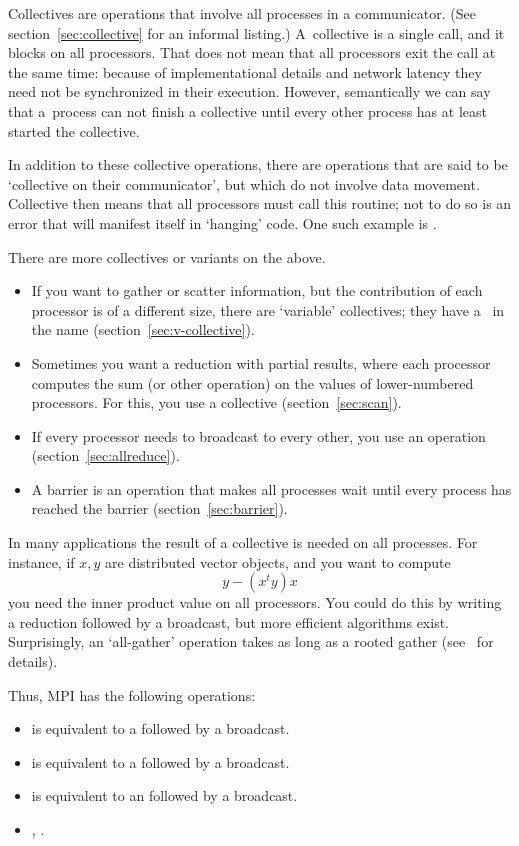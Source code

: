 Collectives are operations that involve all processes in a
communicator. (See section~\ref{sec:collective} for an informal listing.)
A~collective is a
single call, and it blocks on all processors.
That does not mean that
all processors exit the call at the same time: because of
implementational details and network
latency they need not be synchronized in their execution.
However, semantically we can say that
a~process can not finish
a collective until every other process has at least started the collective.

In addition to these collective operations, there are operations that
are said to be `collective on their communicator', but which do not
involve data movement. Collective then means that all processors must
call this routine; not to do so is an error that will 
manifest itself in `hanging' code. One such example is
.

There are more collectives or variants on the above.
\begin{itemize}
\item If you want to gather or scatter information, but the contribution
  of each processor is of a different size, there are `variable' collectives;
  they have a~ in the name (section~\ref{sec:v-collective}).
\item Sometimes you want a reduction with partial results, where each processor
  computes the sum (or other operation) on the values of lower-numbered processors.
  For this, you use a  collective (section~\ref{sec:scan}).
\item If every processor needs to broadcast to every other, you use an
   operation (section~\ref{sec:allreduce}).
\item A barrier is an operation that makes all processes wait until every
  process has reached the barrier (section~\ref{sec:barrier}).
\end{itemize}

In many applications the result of a collective is needed on all processes.
For instance, if $x,y$ are distributed vector objects, and you want to compute
\[ y- (x^ty)x \]
you need the inner product value on all processors. You could do this
by writing a reduction followed by a broadcast, but more efficient
algorithms exist.  Surprisingly, an `all-gather' operation takes as
long as a rooted gather (see~ for details).

Thus, MPI has the following operations:
\begin{itemize}
\item {} is equivalent to a  followed by a broadcast.
\item {} is equivalent to a  followed by a broadcast.
\item {} is equivalent to an  followed by a broadcast.
\item {}, .
\end{itemize}

